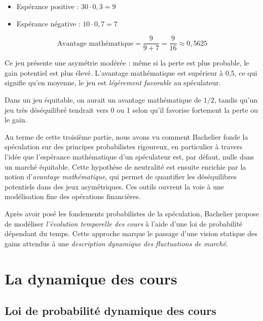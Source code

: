 \documentclass[12pt,a4paper]{article}
\begin{document}
\medskip

\begin{itemize}
    \item Espérance positive : $30 \cdot 0{,}3 = 9$
    \item Espérance négative : $10 \cdot 0{,}7 = 7$
\end{itemize}

\[
\text{Avantage mathématique} = \frac{9}{9 + 7} = \frac{9}{16} \approx 0{,}5625
\]

\medskip

Ce jeu présente une asymétrie modérée : même si la perte est plus probable, le gain potentiel est plus élevé. L’avantage mathématique est supérieur à 0{,}5, ce qui signifie qu’en moyenne, le jeu est \emph{légèrement favorable} au spéculateur.

Dans un jeu équitable, on aurait un avantage mathématique de $1/2$, tandis qu’un jeu très déséquilibré tendrait vers 0 ou 1 selon qu’il favorise fortement la perte ou le gain.

\bigskip

Au terme de cette troisième partie, nous avons vu comment Bachelier fonde la spéculation sur des principes probabilistes rigoureux, en particulier à travers l’idée que l’espérance mathématique d’un spéculateur est, par défaut, nulle dans un marché équitable. Cette hypothèse de neutralité est ensuite enrichie par la notion d’\emph{avantage mathématique}, qui permet de quantifier les déséquilibres potentiels dans des jeux asymétriques. Ces outils ouvrent la voie à une modélisation fine des opérations financières.

Après avoir posé les fondements probabilistes de la spéculation, Bachelier propose de modéliser \textit{l’évolution temporelle des cours} à l’aide d’une loi de probabilité dépendant du temps. Cette approche marque le passage d’une vision statique des gains attendus à une \textit{description dynamique des fluctuations de marché}.

\section{La dynamique des cours} %

\subsection{Loi de probabilité dynamique des cours}
\end{document}
